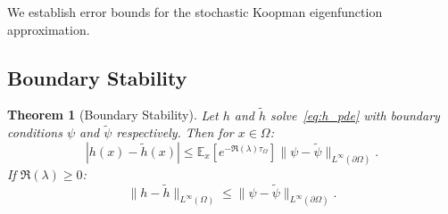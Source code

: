 \documentclass[11pt,a4paper]{article}
\newtheorem{theorem}{Theorem}[section]
\newcommand{\E}{\mathbb{E}}
\begin{document}
We establish error bounds for the stochastic Koopman eigenfunction approximation.

\subsection{Boundary Stability}

\begin{theorem}[Boundary Stability]\label{thm:boundary_stability}
Let $h$ and $\tilde{h}$ solve~\eqref{eq:h_pde} with boundary conditions $\psi$ and $\tilde{\psi}$ respectively. Then for $x \in \Omega$:
\begin{equation}
|h(x) - \tilde{h}(x)| \leq \E_x[e^{-\Re(\lambda) \tau_\Omega}] \|\psi - \tilde{\psi}\|_{L^\infty(\partial\Omega)}.
\end{equation}
If $\Re(\lambda) \geq 0$:
\begin{equation}
\|h - \tilde{h}\|_{L^\infty(\Omega)} \leq \|\psi - \tilde{\psi}\|_{L^\infty(\partial\Omega)}.
\end{equation}
\end{theorem}
\end{document}
